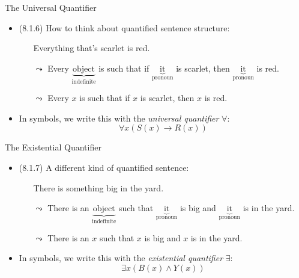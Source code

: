 \begin{frame}{The Universal Quantifier}

	\begin{itemize}%
	\itemsep=16pt
	
		\item (8.1.6) How to think about quantified sentence structure:
		
		\medskip
		
		\begin{itemize}
		\itemsep=10pt
		\item[] Everything that's scarlet is red.
		\item[$\leadsto$] 
		{\footnotesize
		Every $\underbrace{\text{object}}_{\text{indefinite}}$ is such that if $\underbrace{\text{it}}_{\text{pronoun}}$ is scarlet, then $\underbrace{\text{it}}_{\text{pronoun}}$ is red.
		}
		\item[$\leadsto$] Every $x$ is such that if $x$ is scarlet, then $x$ is red.
		\end{itemize}
		
		\item In symbols, we write this with the \emph{universal quantifier} $\forall$:
		\[
		\forall x(S(x)\to R(x))
		\]

	\end{itemize}

\end{frame}

\begin{frame}{The Existential Quantifier}

	\begin{itemize}%
	\itemsep=16pt
	
		\item (8.1.7) A different kind of quantified sentence:
		
		\medskip
		
		\begin{itemize}
		\itemsep=10pt
		\item[] There is something big in the yard.
		\item[$\leadsto$] 
		{\footnotesize
		There is an $\underbrace{\text{object}}_{\text{indefinite}}$ such that $\underbrace{\text{it}}_{\text{pronoun}}$ is big and $\underbrace{\text{it}}_{\text{pronoun}}$ is in the yard.
		}
		\item[$\leadsto$] There is an $x$ such that $x$ is big and $x$ is in the yard.
		\end{itemize}
		
		\item In symbols, we write this with the \emph{existential quantifier} $\exists$:
		\[
		\exists x(B(x)\land Y(x))
		\]

	\end{itemize}

\end{frame}

